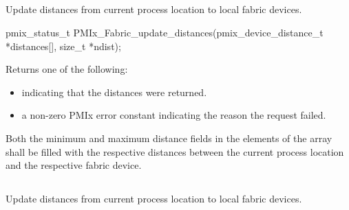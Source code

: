 \subsection{}

\summary

Update distances from current process location to local fabric devices.

\format

\cspecificstart
\begin{codepar}
pmix_status_t
PMIx_Fabric_update_distances(pmix_device_distance_t *distances[],
                             size_t *ndist);
\end{codepar}
\cspecificend

\begin{arglist}
\end{arglist}

Returns one of the following:

\begin{itemize}
\item {} indicating that the distances were returned.
\item a non-zero \ac{PMIx} error constant indicating the reason the request failed.
\end{itemize}


\descr

Both the minimum and maximum distance fields in the elements of the array shall be filled with the respective distances between the current process location and the respective fabric device.


\subsection{}

\summary

Update distances from current process location to local fabric devices.

